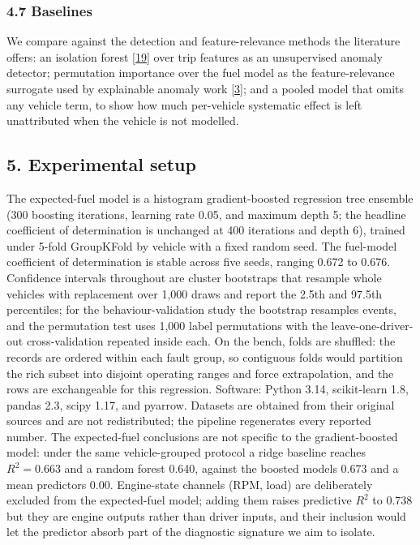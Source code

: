 \subsubsection{4.7 Baselines}\label{baselines}

We compare against the detection and feature-relevance methods the
literature offers: an isolation forest {[}\hyperref[r19]{19}{]} over
trip features as an unsupervised anomaly detector; permutation
importance over the fuel model as the feature-relevance surrogate used
by explainable anomaly work {[}\hyperref[r3]{3}{]}; and a pooled model
that omits any vehicle term, to show how much per-vehicle systematic
effect is left unattributed when the vehicle is not modelled.

\subsection{5. Experimental setup}\label{setup}

The expected-fuel model is a histogram gradient-boosted regression tree
ensemble (300 boosting iterations, learning rate 0.05, and maximum depth
5; the headline coefficient of determination is unchanged at 400
iterations and depth 6), trained under 5-fold GroupKFold by vehicle with
a fixed random seed. The fuel-model coefficient of determination is
stable across five seeds, ranging 0.672 to 0.676. Confidence intervals
throughout are cluster bootstraps that resample whole vehicles with
replacement over 1,000 draws and report the 2.5th and 97.5th
percentiles; for the behaviour-validation study the bootstrap resamples
events, and the permutation test uses 1,000 label permutations with the
leave-one-driver-out cross-validation repeated inside each. On the
bench, folds are shuffled: the records are ordered within each fault
group, so contiguous folds would partition the rich subset into disjoint
operating ranges and force extrapolation, and the rows are exchangeable
for this regression. Software: Python 3.14, scikit-learn 1.8, pandas
2.3, scipy 1.17, and pyarrow. Datasets are obtained from their original
sources and are not redistributed; the pipeline regenerates every
reported number. The expected-fuel conclusions are not specific to the
gradient-boosted model: under the same vehicle-grouped protocol a ridge
baseline reaches \(R^2 = 0.663\) and a random forest 0.640, against the
boosted model\textquotesingle s 0.673 and a mean
predictor\textquotesingle s 0.00. Engine-state channels (RPM, load) are
deliberately excluded from the expected-fuel model; adding them raises
predictive \(R^2\) to 0.738 but they are engine outputs rather than
driver inputs, and their inclusion would let the predictor absorb part
of the diagnostic signature we aim to isolate.

